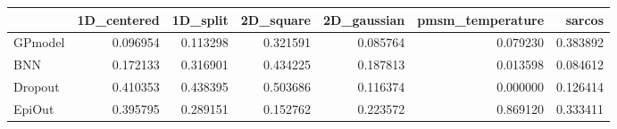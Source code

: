 \begin{tabular}{lrrrrrr}
\toprule
{} &  1D\_centered &  1D\_split &  2D\_square &  2D\_gaussian &  pmsm\_temperature &    sarcos \\
\midrule
GPmodel &     0.096954 &  0.113298 &   0.321591 &     0.085764 &          0.079230 &  0.383892 \\
BNN     &     0.172133 &  0.316901 &   0.434225 &     0.187813 &          0.013598 &  0.084612 \\
Dropout &     0.410353 &  0.438395 &   0.503686 &     0.116374 &          0.000000 &  0.126414 \\
EpiOut  &     0.395795 &  0.289151 &   0.152762 &     0.223572 &          0.869120 &  0.333411 \\
\bottomrule
\end{tabular}
